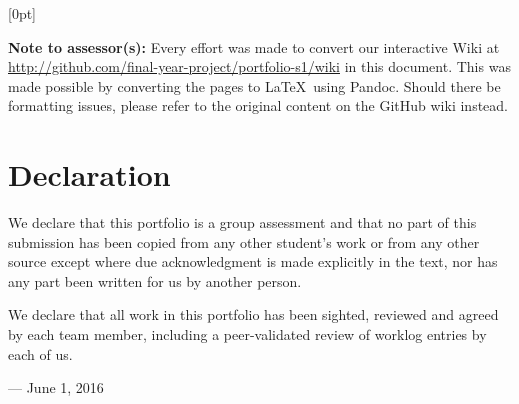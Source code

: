 %
%
\def \unitcode      {SWE40001}
\def \unitname      {Software Engineering Project A}


\usepackage{titletoc}
\linespread{1.5}

  [0pt]%
  {}%
  {\chaptername\ \thecontentslabel\quad}%
  {}%
  {\rmfamily \hfill\contentspage\\}%



\titlepagehere
\cleartoleftpage

\noindent
\textbf{Note to assessor(s):} Every effort was made to convert our interactive Wiki
at \url{http://github.com/final-year-project/portfolio-s1/wiki} in this document.
This was made possible by converting the pages to \LaTeX\ using Pandoc. Should there
be formatting issues, please refer to the original content on the GitHub wiki instead.

\cleartoleftpage

\section*{Declaration}

We declare that this portfolio is a group assessment and that no part of this
submission has been copied from any other student's work or from any other
source except where due acknowledgment is made explicitly in the text, nor has
any part been written for us by another person.

We declare that all work in this portfolio has been sighted, reviewed and agreed
by each team member, including a peer-validated review of worklog entries by
each of us.

\hfill --- June 1, 2016

\vspace{5em}

